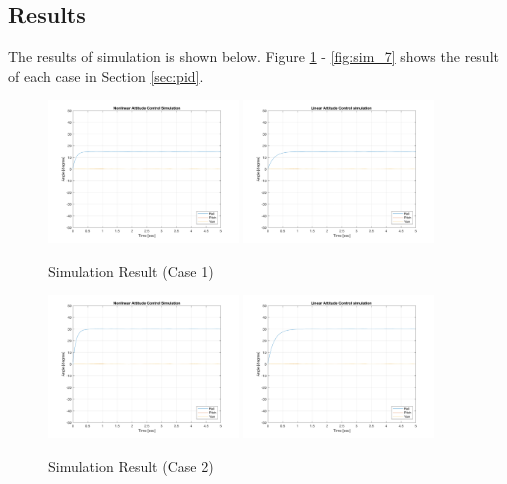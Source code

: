 \subsection{Results}
The results of simulation is shown below. Figure \ref{fig:sim_1} - \ref{fig:sim_7} shows the result of each case in Section \ref{sec:pid}. \\
\begin{figure}[p]
    \centering
    \includegraphics[width=0.45\textwidth]{graphics/phi_03_non.png}
    \includegraphics[width=0.45\textwidth]{graphics/phi_03_pid.png}
    \caption{Simulation Result (Case 1)}
    \label{fig:sim_1}
\end{figure}

\begin{figure}
    \centering
    \includegraphics[width=0.45\textwidth]{graphics/phi_05_non.png}
    \includegraphics[width=0.45\textwidth]{graphics/phi_05_pid.png}
    \caption{Simulation Result (Case 2)}
    \label{fig:sim_2}
\end{figure}

